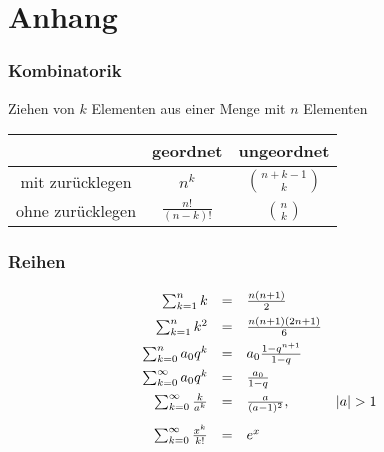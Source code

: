 


\part*{Anhang}
\setcounter{part}{1}
\setcounter{section}{0}




\section{Kombinatorik}

Ziehen von \(k\) Elementen aus einer Menge mit \(n\) Elementen
\begin{center}
	\begin{tabular}{|c||c|c|}\hline
		                 & geordnet              & ungeordnet            \\\hline\hline
		mit zurücklegen  & \(n^k\)               & \({n+k-1 \choose k}\) \\\hline
		ohne zurücklegen & \(\frac{n!}{(n-k)!}\) & \({n \choose k}\)     \\\hline
	\end{tabular}
\end{center}




\section{Reihen}

\[
	\begin{array}{rcll}
		\sum_{k=1}^n k                   & = & \frac{n(n+1)}{2}            &             \\[0.5em]
		\sum_{k=1}^n k^2                 & = & \frac{n(n+1)(2n+1)}{6}      &             \\[0.5em]
		\sum_{k=0}^n      a_0 q^k        & = & a_0 \frac{1-q^{n+1}}{1-q}   &             \\[0.5em]
		\sum_{k=0}^\infty a_0 q^k        & = & \frac{a_0}{1-q}             &             \\[0.5em]
		\sum_{k=0}^\infty \frac{k}{a^k}  & = & \frac{a}{(a-1)^2}         , & \lvert a \rvert > 1 \\[1em]
		\sum_{k=0}^\infty \frac{x^k}{k!} & = & e^x                         &
	\end{array}
\]


